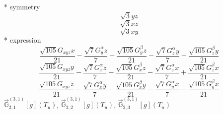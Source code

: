 \documentclass[fleqn,8pt]{jsarticle}
\begin{document}
\noindent\quad ** symmetry
\begin{dmath*}
\sqrt{3} y z
\end{dmath*}
\begin{dmath*}
\sqrt{3} x z
\end{dmath*}
\begin{dmath*}
\sqrt{3} x y
\end{dmath*}
\noindent\quad ** expression
\begin{dmath*}
\frac{\sqrt{105} G_{xyz} x}{21} - \frac{\sqrt{7} G_{y}^{\alpha} z}{7} + \frac{\sqrt{105} G_{y}^{\beta} z}{21} - \frac{\sqrt{7} G_{z}^{\alpha} y}{7} - \frac{\sqrt{105} G_{z}^{\beta} y}{21}
\end{dmath*}
\begin{dmath*}
\frac{\sqrt{105} G_{xyz} y}{21} - \frac{\sqrt{7} G_{x}^{\alpha} z}{7} - \frac{\sqrt{105} G_{x}^{\beta} z}{21} - \frac{\sqrt{7} G_{z}^{\alpha} x}{7} + \frac{\sqrt{105} G_{z}^{\beta} x}{21}
\end{dmath*}
\begin{dmath*}
\frac{\sqrt{105} G_{xyz} z}{21} - \frac{\sqrt{7} G_{x}^{\alpha} y}{7} + \frac{\sqrt{105} G_{x}^{\beta} y}{21} - \frac{\sqrt{7} G_{y}^{\alpha} x}{7} - \frac{\sqrt{105} G_{y}^{\beta} x}{21}
\end{dmath*}
\noindent\quad $\vec{\mathbb{G}}_{2,1}^{(3,1)}[g](T_{u})$, $\vec{\mathbb{G}}_{2,2}^{(3,1)}[g](T_{u})$, $\vec{\mathbb{G}}_{2,3}^{(3,1)}[g](T_{u})$
\end{document}
